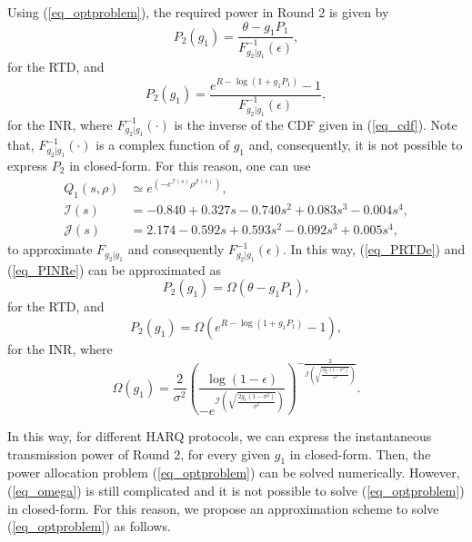 Using (\ref{eq_optproblem}), the required power in Round 2 is given by
\begin{equation}
\label{eq_PRTDe}
    P_2(g_1) = \frac{\theta-g_1P_1}{F_{g_2|g_1}^{-1}(\epsilon)},
\end{equation}
for the RTD, and
\begin{equation}
\label{eq_PINRe}
    P_2(g_1) = \frac{e^{R-\log(1+g_1P_1)}-1}{F_{g_2|g_1}^{-1}(\epsilon)},
\end{equation}
for the INR, where $F_{g_2|g_1}^{-1}(\cdot)$ is the inverse of the CDF given in (\ref{eq_cdf}). Note that, $F_{g_2|g_1}^{-1}(\cdot)$ is a complex function of $g_1$ and, consequently, it is not possible to express $P_2$ in closed-form. For this reason, one can use   \cite[Eq. 2, 7]{6414576}
\begin{align}
    Q_1 (s, \rho) &\simeq e^{\left(-e^{\mathcal{I}(s)}\rho^{\mathcal{J}(s)}\right)}, \nonumber\\
    \mathcal{I}(s)& = -0.840+0.327s-0.740s^2+0.083s^3-0.004s^4,\nonumber\\
    \mathcal{J}(s)& = 2.174-0.592s+0.593s^2-0.092s^3+0.005s^4,
\end{align}
to approximate $F_{g_2|g_1}$ and consequently $F_{g_2|g_1}^{-1}(\epsilon)$. In this way, (\ref{eq_PRTDe}) and (\ref{eq_PINRe}) can be approximated as
\begin{equation}
\label{eq_PRTDa}
    P_2(g_1) = \Omega\left(\theta-g_1P_1\right),
\end{equation}
for the RTD, and
\begin{equation}
\label{eq_PINRa}
   P_2(g_1) = \Omega\left(e^{R-\log(1+g_1P_1)}-1\right),
\end{equation}
for the INR, where
\begin{equation}\label{eq_omega}
    \Omega (g_1) = \frac{2}{\sigma^2}\left(\frac{\log(1-\epsilon)}{-e^{\mathcal{I}\left(\sqrt{\frac{2g_1(1-\sigma^2)}{\sigma^2}}\right)}}\right)^{-\frac{2}{\mathcal{J}\left(\sqrt{\frac{2g_1(1-\sigma^2)}{\sigma^2}}\right)}}.
\end{equation}



In this way, for different HARQ protocols, we can express the  instantaneous transmission power of Round 2, for every given $g_1$ in closed-form. Then, the  power allocation problem (\ref{eq_optproblem}) can be solved numerically. However, (\ref{eq_omega}) is still complicated and it is not possible to solve (\ref{eq_optproblem}) in closed-form. For this reason, we propose an approximation scheme to solve (\ref{eq_optproblem}) as follows.




